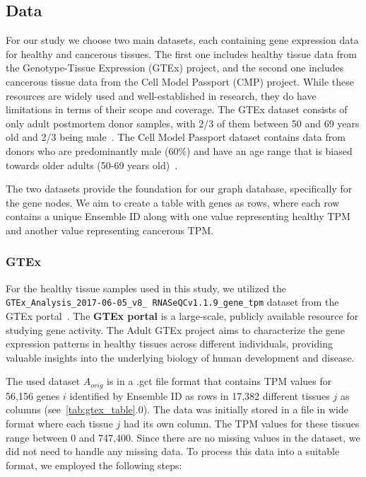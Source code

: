 \subsection{Data} \label{subsec:data}

For our study we choose two main datasets, each containing gene expression data for healthy and cancerous tissues.
The first one includes healthy tissue data from the Genotype-Tissue Expression (GTEx) project,
and the second one includes cancerous tissue data from the Cell Model Passport (CMP) project.
While these resources are widely used and well-established in research, they do have limitations in terms of their scope and coverage.
The GTEx dataset consists of only adult postmortem donor samples, with 2/3 of them between 50 and 69 years old and 2/3 being male~\cite{GTEX_modelannotation}.
The Cell Model Passport dataset contains data from donors who are predominantly male (60\%)
and have an age range that is biased towards older adults (50-69 years old)~\cite{CMP_modelannotation}.

The two datasets provide the foundation for our graph database, specifically for the gene nodes.
We aim to create a table with genes as rows,
where each row contains a unique Ensemble ID along with one value representing healthy TPM and another value representing cancerous TPM.
\\

\subsubsection*{GTEx} \label{subsubsec:GTEx}
For the healthy tissue samples used in this study,
we utilized the \texttt{GTEx\_Analysis\_2017-06-05\_v8\_\newline
RNASeQCv1.1.9\_gene\_tpm} dataset from the GTEx portal~\cite{gtex_download}.
The \textbf{GTEx portal} is a large-scale, publicly available resource for studying gene activity.
The Adult GTEx project aims to characterize the gene expression patterns in healthy tissues across different individuals,
providing valuable insights into the underlying biology of human development and disease.

The used dataset $A_{orig}$ is in a .gct file format that contains TPM values for 56,156 genes $i$ identified by
Ensemble ID as rows in 17,382 different tissues $j$ as columns (see~\cref{tab:gtex_table}.0).
The data was initially stored in a file in wide format where each tissue $j$ had its own column.
The TPM values for these tissues range between 0 and 747,400.
Since there are no missing values in the dataset, we did not need to handle any missing data.
To process this data into a suitable format, we employed the following steps:

